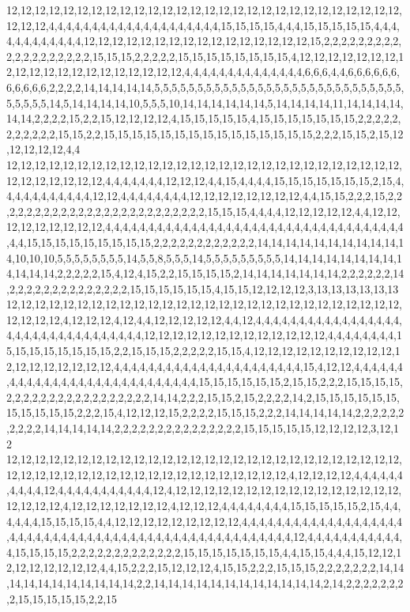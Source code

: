 12,12,12,12,12,12,12,12,12,12,12,12,12,12,12,12,12,12,12,12,12,12,12,12,12,12,12,12,12,12,12,4,4,4,4,4,4,4,4,4,4,4,4,4,4,4,4,4,4,4,4,15,15,15,15,4,4,4,15,15,15,15,15,4,4,4,4,4,4,4,4,4,4,4,4,12,12,12,12,12,12,12,12,12,12,12,12,12,12,12,12,15,2,2,2,2,2,2,2,2,2,2,2,2,2,2,2,2,2,2,2,15,15,15,2,2,2,2,2,15,15,15,15,15,15,15,15,4,12,12,12,12,12,12,12,12,12,12,12,12,12,12,12,12,12,12,12,12,4,4,4,4,4,4,4,4,4,4,4,4,4,4,6,6,6,4,4,6,6,6,6,6,6,6,6,6,6,6,2,2,2,2,14,14,14,14,14,5,5,5,5,5,5,5,5,5,5,5,5,5,5,5,5,5,5,5,5,5,5,5,5,5,5,5,5,5,5,5,5,5,5,14,5,14,14,14,14,10,5,5,5,10,14,14,14,14,14,14,5,14,14,14,14,11,14,14,14,14,14,14,2,2,2,2,15,2,2,15,12,12,12,12,4,15,15,15,15,15,4,15,15,15,15,15,15,15,2,2,2,2,2,2,2,2,2,2,2,15,15,2,2,15,15,15,15,15,15,15,15,15,15,15,15,15,15,15,2,2,2,15,15,2,15,12,12,12,12,12,4,4
12,12,12,12,12,12,12,12,12,12,12,12,12,12,12,12,12,12,12,12,12,12,12,12,12,12,12,12,12,12,12,12,12,12,12,4,4,4,4,4,4,4,12,12,12,4,4,15,4,4,4,4,15,15,15,15,15,15,15,2,15,4,4,4,4,4,4,4,4,4,4,4,12,12,4,4,4,4,4,4,4,4,12,12,12,12,12,12,12,12,4,4,15,15,2,2,2,15,2,2,2,2,2,2,2,2,2,2,2,2,2,2,2,2,2,2,2,2,2,2,2,2,2,15,15,15,4,4,4,4,12,12,12,12,12,4,4,12,12,12,12,12,12,12,12,12,4,4,4,4,4,4,4,4,4,4,4,4,4,4,4,4,4,4,4,4,4,4,4,4,4,4,4,4,4,4,4,4,4,4,4,4,4,15,15,15,15,15,15,15,15,15,2,2,2,2,2,2,2,2,2,2,2,2,14,14,14,14,14,14,14,14,14,14,14,10,10,10,5,5,5,5,5,5,5,5,14,5,5,8,5,5,5,14,5,5,5,5,5,5,5,5,5,14,14,14,14,14,14,14,14,14,14,14,14,2,2,2,2,2,15,4,12,4,15,2,2,15,15,15,15,2,14,14,14,14,14,14,14,2,2,2,2,2,2,14,2,2,2,2,2,2,2,2,2,2,2,2,2,2,15,15,15,15,15,15,4,15,15,12,12,12,12,3,13,13,13,13,13,13
12,12,12,12,12,12,12,12,12,12,12,12,12,12,12,12,12,12,12,12,12,12,12,12,12,12,12,12,12,12,12,12,4,12,12,12,4,12,4,4,12,12,12,12,12,4,4,12,4,4,4,4,4,4,4,4,4,4,4,4,4,4,4,4,4,4,4,4,4,4,4,4,4,4,4,4,4,4,4,4,4,12,12,12,12,12,12,12,12,12,12,12,12,12,4,4,4,4,4,4,4,4,15,15,15,15,15,15,15,15,2,2,15,15,15,2,2,2,2,2,15,15,4,12,12,12,12,12,12,12,12,12,12,12,12,12,12,12,12,12,12,4,4,4,4,4,4,4,4,4,4,4,4,4,4,4,4,4,4,4,4,4,4,15,4,12,12,4,4,4,4,4,4,4,4,4,4,4,4,4,4,4,4,4,4,4,4,4,4,4,4,4,4,4,4,15,15,15,15,15,15,2,15,15,2,2,2,15,15,15,15,2,2,2,2,2,2,2,2,2,2,2,2,2,2,2,2,2,14,14,2,2,2,15,15,2,15,2,2,2,2,14,2,15,15,15,15,15,15,15,15,15,15,15,2,2,2,15,4,12,12,12,15,2,2,2,2,15,15,15,2,2,2,14,14,14,14,14,2,2,2,2,2,2,2,2,2,2,14,14,14,14,14,2,2,2,2,2,2,2,2,2,2,2,2,2,2,2,15,15,15,15,15,12,12,12,12,3,12,12
12,12,12,12,12,12,12,12,12,12,12,12,12,12,12,12,12,12,12,12,12,12,12,12,12,12,12,12,12,12,12,12,12,12,12,12,12,12,12,12,12,12,12,12,12,12,12,12,4,12,12,12,12,4,4,4,4,4,4,4,4,4,4,12,4,4,4,4,4,4,4,4,4,4,4,12,4,12,12,12,12,12,12,12,12,12,12,12,12,12,12,12,12,12,12,12,12,4,12,12,12,12,12,12,12,4,12,12,12,4,4,4,4,4,4,4,4,15,15,15,15,15,2,15,4,4,4,4,4,4,15,15,15,15,4,4,12,12,12,12,12,12,12,12,12,4,4,4,4,4,4,4,4,4,4,4,4,4,4,4,4,4,4,4,4,4,4,4,4,4,4,4,4,4,4,4,4,4,4,4,4,4,4,4,4,4,4,4,4,4,4,4,4,4,4,4,4,12,4,4,4,4,4,4,4,4,4,4,4,4,15,15,15,15,2,2,2,2,2,2,2,2,2,2,2,2,2,15,15,15,15,15,15,15,4,4,15,15,4,4,4,15,12,12,12,12,12,12,12,12,12,4,4,15,2,2,2,15,12,12,12,4,15,15,2,2,2,15,15,15,2,2,2,2,2,2,2,14,14,14,14,14,14,14,14,14,14,14,2,2,14,14,14,14,14,14,14,14,14,14,14,14,2,14,2,2,2,2,2,2,2,2,15,15,15,15,15,2,2,15
